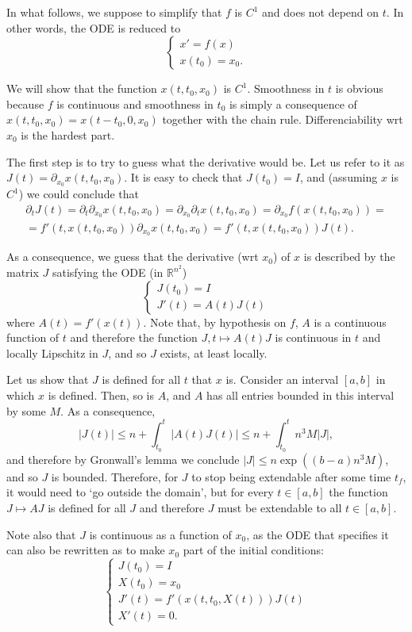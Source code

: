 \documentclass{article}
\newcommand{\R}{\mathbb{R}}
\begin{document}
In what follows, we suppose to simplify that $f$ is $C^1$ and does not depend on $t$. In other words, the ODE is reduced to
\[
\begin{cases}
x' = f(x)\\
x(t_0) = x_0.
\end{cases}
\]

We will show that the function $x(t,t_0,x_0)$ is $C^1$. Smoothness in $t$ is obvious because $f$ is continuous and smoothness in $t_0$ is simply a consequence of $x(t,t_0,x_0) = x(t-t_0, 0, x_0)$ together with the chain rule. Differenciability wrt $x_0$ is the hardest part.

The first step is to try to guess what the derivative would be. Let us refer to it as $J(t) = \partial_{x_0} x(t,t_0,x_0)$. It is easy to check that $J(t_0) = I$, and (assuming $x$ is $C^1$) we could conclude that
\begin{multline*}
\partial_t J(t) = \partial_t \partial_{x_0} x(t,t_0,x_0) = \partial_{x_0} \partial_t x(t,t_0,x_0) = \partial_{x_0} f(x(t,t_0,x_0)) =\\
= f'(t, x(t,t_0,x_0)) \partial_{x_0} x(t,t_0,x_0) = f'(t, x(t,t_0,x_0)) J(t).
\end{multline*}

As a consequence, we guess that the derivative (wrt $x_0$) of $x$ is described by the matrix $J$ satisfying the ODE (in $\R^{n^2}$)
\[
\begin{cases}
J(t_0) = I\\
J'(t) = A(t) J(t)
\end{cases}
\]
where $A(t) = f'(x(t))$. Note that, by hypothesis on $f$, $A$ is a continuous function of $t$ and therefore the function $J, t \mapsto A(t) J$ is continuous in $t$ and locally Lipschitz in $J$, and so $J$ exists, at least locally.

Let us show that $J$ is defined for all $t$ that $x$ is. Consider an interval $[a,b]$ in which $x$ is defined. Then, so is $A$, and $A$ has all entries bounded in this interval by some $M$. As a consequence,
\[\lvert J(t) \rvert \leq n + \int_{t_0}^t \lvert A(t) J(t) \rvert \leq n + \int_{t_0}^t n^3 M \lvert J \rvert,\]
and therefore by Gronwall's lemma we conclude $\lvert J \rvert \leq n \exp((b-a) n^3 M)$, and so $J$ is bounded. Therefore, for $J$ to stop being extendable after some time $t_f$, it would need to `go outside the domain', but for every $t \in [a,b]$ the function $J \mapsto AJ$ is defined for all $J$ and therefore $J$ must be extendable to all $t \in [a,b]$.

Note also that $J$ is continuous as a function of $x_0$, as the ODE that specifies it can also be rewritten as to make $x_0$ part of the initial conditions:
\[
\begin{cases}
J(t_0) = I\\
X(t_0) = x_0\\
J'(t) = f'(x(t,t_0,X(t))) J(t)\\
X'(t) = 0.
\end{cases}
\]
\end{document}
